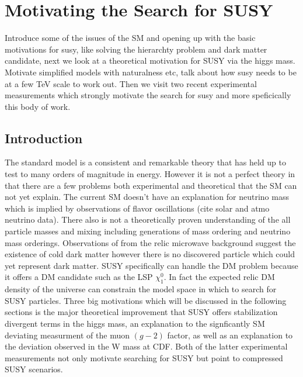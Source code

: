 
\setcounter{secnumdepth}{3}
\setcounter{tocdepth}{3}

\setlength{\parindent}{1 em}


\makeatother


\chapter{Motivating the Search for SUSY}

\begin{chapterabstract}
Introduce some of the issues of the SM and opening up with the basic motivations for susy, like solving the hierarchty problem and dark matter candidate, next we look at a theoretical motivation for SUSY via the higgs mass. Motivate simplified models with naturalness etc, talk about how susy needs to be at a few TeV scale to work out. Then we visit two recent experimental measurements which strongly motivate the search for susy and more speficically this body of work.
\end{chapterabstract}

\section{Introduction}

The standard model is a consistent and remarkable theory that has held up to test to many orders of magnitude in energy. However it is not a perfect theory in that there are a few problems both experimental and theoretical that the SM can not yet explain. The current SM doesn't have an explanation for neutrino mass which is implied by observations of flavor oscillations (cite solar and atmo neutrino data). There also is not a theoretically proven understanding of the all particle masses and mixing including generations of mass ordering and neutrino mass orderings. Observations of from the relic microwave background suggest the existence of cold dark matter however there is no discovered particle which could yet represent dark matter. SUSY specifically can handle the DM problem because it offers a DM candidate such as the LSP $\chi_1^0$. In fact the expected relic DM density of the universe can constrain the model space in which to search for SUSY particles. Three big motivations which will be discussed in the following sections is the  major theoretical improvement that SUSY offers stabilization divergent terms in the higgs mass, an explanation to the signficantly SM deviating measurment of the muon $(g-2)$ factor, as well as an explanation to the deviation observed in the W mass at CDF. Both of the latter experimental measurements not only motivate searching for SUSY but point to compressed SUSY scenarios.



